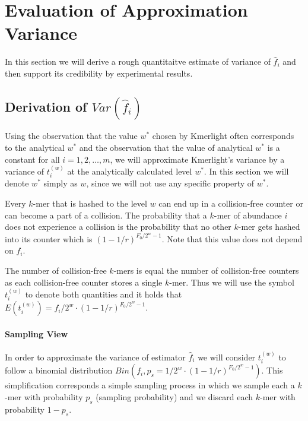 \section{Evaluation of Approximation Variance}
\label{sec:estimation-variance}

In this section we will derive a rough quantitaitve estimate of variance of $ \hat f_i$
and then support its credibility by experimental results.

\subsection{Derivation of $Var(\hat f_i)$}
Using the observation that the value $w^*$ chosen by Kmerlight often corresponds
to the analytical $w^*$ and the observation that the value of analytical $w^*$ is a constant
for all $i=1, 2, \dots, m$, we will approximate Kmerlight's variance by a variance
of $t_i^{(w)}$ at the analytically calculated level $w^*$. In this section we will denote
$w^*$ simply as $w$, since we will not use any specific property of $w^*$.

Every $k$-mer that is hashed to the level $w$ can end up 
in a collision-free counter or can become a part of a collision.
The probability that a $k$-mer of abundance $i$ does not experience a collision is
the probability that no other $k$-mer gets hashed into its counter which is
$(1 - 1/r)^{F_0/2^w-1}$. Note that this value does not depend on $f_i$.

The number of collision-free $k$-mers is equal the number of collision-free counters
as each collision-free counter stores a single $k$-mer. Thus we will use the symbol
$t_i^{(w)}$ to denote both quantities and it holds that 
$E(t_i^{(w)}) = f_i/2^w \cdot (1 - 1/r)^{F_0/2^w-1}$.

% 

\paragraph{Sampling View}
In order to approximate the variance of estimator $\hat f_i$ we will consider
$t_i^{(w)}$ to follow a binomial distribution $Bin(f_i, p_s = 1/2^w \cdot (1 - 1/r)^{F_0/2^w-1})$.
This simplification corresponds a simple sampling process in which we sample each a $k$-mer
with probability $p_s$ (sampling probability) and we discard each $k$-mer
with probability $1 - p_s$.

